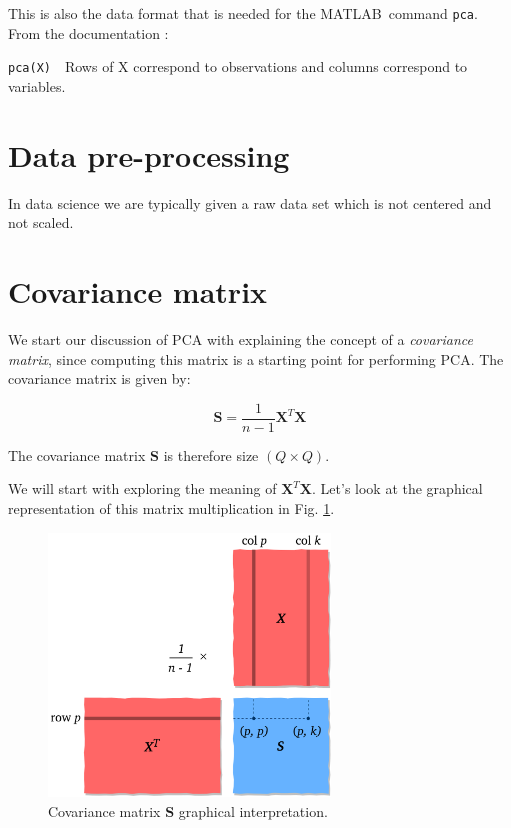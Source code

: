 \documentclass[10pt,twocolumn]{article}
\begin{document}
This is also the data format that is needed for the MATLAB\textregistered \, command \texttt{pca}. From the documentation \cite{Matlab-pca}:


\begin{framed}
\texttt{pca(X)}
\,\,
Rows of X correspond to observations and columns correspond to variables.
\end{framed}

\section{Data pre-processing}

In data science we are typically given a raw data set which is not centered and not scaled. 

\section{Covariance matrix}

We start our discussion of PCA with explaining the concept of a \textit{covariance matrix}, since computing this matrix is a starting point for performing PCA. The covariance matrix is given by:

\begin{equation}
\bm{S} = \frac{1}{n-1} \bm{X}^T \bm{X}
\end{equation}

The covariance matrix $\bm{S}$ is therefore size $(Q \times Q)$.

We will start with exploring the meaning of $\bm{X}^T \bm{X}$. Let's look at the graphical representation of this matrix multiplication in Fig. \ref{fig:covariance-matrix}.

\begin{figure}[H]
\centering\includegraphics[width=7.5cm]{cov-matrix.png}
\caption{Covariance matrix $\bm{S}$ graphical interpretation.}
\label{fig:covariance-matrix}
\end{figure}
\end{document}
